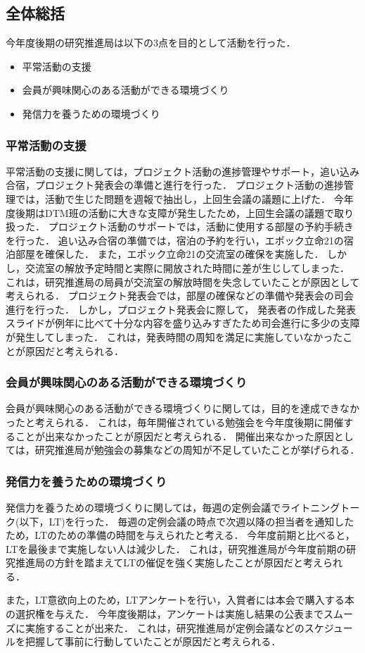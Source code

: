 \subsection*{全体総括}

今年度後期の研究推進局は以下の3点を目的として活動を行った．
\begin{itemize}
\item 平常活動の支援
\item 会員が興味関心のある活動ができる環境づくり
\item 発信力を養うための環境づくり
\end{itemize}

\subsubsection*{平常活動の支援}
平常活動の支援に関しては，プロジェクト活動の進捗管理やサポート，追い込み合宿，プロジェクト発表会の準備と進行を行った．
プロジェクト活動の進捗管理では，活動で生じた問題を週報で抽出し，上回生会議の議題に上げた．
今年度後期はDTM班の活動に大きな支障が発生したため，上回生会議の議題で取り扱った．
プロジェクト活動のサポートでは，活動に使用する部屋の予約手続きを行った．
追い込み合宿の準備では，宿泊の予約を行い，エポック立命21の宿泊部屋を確保した．
また，エポック立命21の交流室の確保を実施した．
しかし，交流室の解放予定時間と実際に開放された時間に差が生じしてしまった．
これは，研究推進局の局員が交流室の解放時間を失念していたことが原因として考えられる．
プロジェクト発表会では，部屋の確保などの準備や発表会の司会進行を行った．
しかし，プロジェクト発表会に際して， 発表者の作成した発表スライドが例年に比べて十分な内容を盛り込みすぎたため司会進行に多少の支障が発生してしまった．
これは，発表時間の周知を満足に実施していなかったことが原因だと考えられる．

\subsubsection*{会員が興味関心のある活動ができる環境づくり} 
会員が興味関心のある活動ができる環境づくりに関しては，目的を達成できなかったと考えられる．
これは，毎年開催されている勉強会を今年度後期に開催することが出来なかったことが原因だと考えられる．
開催出来なかった原因としては，研究推進局が勉強会の募集などの周知が不足していたことが挙げられる．

\subsubsection*{発信力を養うための環境づくり} 
発信力を養うための環境づくりに関しては，毎週の定例会議でライトニングトーク(以下，LT)を行った．
毎週の定例会議の時点で次週以降の担当者を通知したため，LTのための準備の時間を与えられたと考える．
今年度前期と比べると，LTを最後まで実施しない人は減少した．
これは，研究推進局が今年度前期の研究推進局の方針を踏まえてLTの催促を強く実施したことが原因だと考えられる．

また，LT意欲向上のため，LTアンケートを行い，入賞者には本会で購入する本の選択権を与えた．
今年度後期は，アンケートは実施し結果の公表までスムーズに実施することが出来た．
これは，研究推進局が定例会議などのスケジュールを把握して事前に行動していたことが原因だと考えられる．

